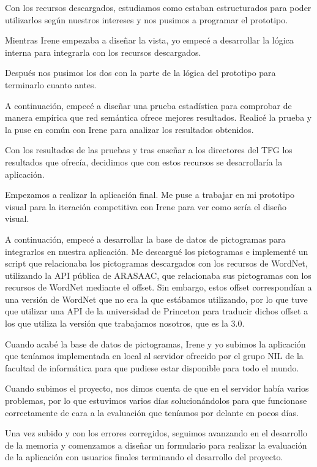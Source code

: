 Con los recursos descargados, estudiamos como estaban estructurados para poder utilizarlos según nuestros intereses y nos pusimos a programar el prototipo.

Mientras Irene empezaba a diseñar la vista, yo empecé a desarrollar la lógica interna para integrarla con los recursos descargados.

Después nos pusimos los dos con la parte de la lógica del prototipo para terminarlo cuanto antes.

A continuación, empecé a diseñar una prueba estadística para comprobar de manera empírica que red semántica ofrece mejores resultados. Realicé la prueba y la puse en común con Irene para analizar los resultados obtenidos.

Con los resultados de las pruebas y tras enseñar a los directores del TFG los resultados que ofrecía, decidimos que con estos recursos se desarrollaría la aplicación. 

Empezamos a realizar la aplicación final. Me puse a trabajar en mi prototipo visual para la iteración competitiva con Irene para ver como sería el diseño visual.

A continuación, empecé a desarrollar la base de datos de pictogramas para integrarlos en nuestra aplicación. Me descargué los pictogramas e implementé un script que relacionaba los pictogramas descargados con los recursos de WordNet, utilizando la API pública de ARASAAC, que relacionaba sus pictogramas con los recursos de WordNet mediante el offset. Sin embargo, estos offset correspondían a una versión de WordNet que no era la que estábamos utilizando, por lo que tuve que utilizar una API de la universidad de Princeton para traducir dichos offset a los que utiliza la versión que trabajamos nosotros, que es la 3.0.

Cuando acabé la base de datos de pictogramas, Irene y yo subimos la aplicación que teníamos implementada en local al servidor ofrecido por el grupo NIL de la facultad de informática para que pudiese estar disponible para todo el mundo. 

Cuando subimos el proyecto, nos dimos cuenta de que en el servidor había varios problemas, por lo que estuvimos varios días solucionándolos para que funcionase correctamente de cara a la evaluación que teníamos por delante en pocos días.


Una vez subido y con los errores corregidos, seguimos avanzando en el desarrollo de la memoria y comenzamos a diseñar un formulario para realizar la evaluación de la aplicación con usuarios finales terminando el desarrollo del proyecto.


